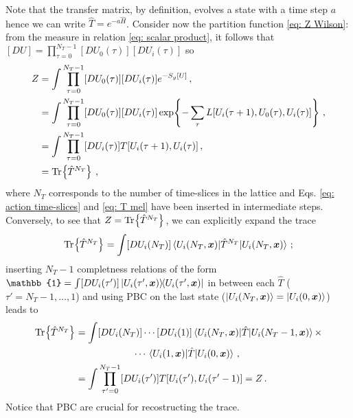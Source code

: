 \documentclass{article}
\begin{document}
Note that the transfer matrix, by definition, evolves a state with a time step $a$ hence we can write $\hat{T} = e^{-a \hat{H}}$. Consider now the partition function \eqref{eq: Z Wilson}: from the measure in relation \eqref{eq: scalar product}, it follows that $[D U] = \prod_{\tau=0}^{N_T-1} [D U_0(\tau)] [D U_i(\tau)]$ so
\begin{align}
    Z &= \int \prod_{\tau=0}^{N_T-1} [D U_0(\tau)] [D U_i(\tau)] e^{-S_g[U]} \, , \\
    &= \int \prod_{\tau=0}^{N_T-1} [D U_0(\tau)] [D U_i(\tau)] \exp \! \left\{ - \sum_\tau L[U_i(\tau+1), U_0(\tau), U_i(\tau)] \right\} \, , \\
    &= \int \prod_{\tau=0}^{N_T-1} [D U_i(\tau)] T[U_i(\tau+1), U_i(\tau)] \, , \\
    &= \Tr \! \left\{ \hat{T}^{N_T} \right\} \, ,
\end{align}
where $N_T$ corresponds to the number of time-slices in the lattice and Eqs. \eqref{eq: action time-slices} and \eqref{eq: T mel} have been inserted in intermediate steps. Conversely, to see that $Z = \Tr \! \left\{ \hat{T}^{N_T} \right\}$, we can explicitly expand the trace 
\begin{equation}
    \Tr \! \left\{ \hat{T}^{N_T} \right\} = \int [DU_i(N_T)] \mel{U_i(N_T, \vb*{x})}{\hat{T}^{N_T}}{U_i(N_T, \vb*{x})} \, ;
\end{equation}
inserting $N_T-1$ completness relations of the form $\mathbb{1} = \int [DU_i(\tau')] \ketbra{U_i(\tau', \vb*{x})}{U_i(\tau', \vb*{x})}$ in between each $\hat{T}$ ($\tau' = N_T-1, \ldots, 1$) and using PBC on the last state ($\ket{U_i(N_T, \vb*{x})} = \ket{U_i(0, \vb*{x})}$) leads to 
\begin{align}
    \Tr \! \left\{ \hat{T}^{N_T} \right\} &= \int [DU_i(N_T)] \cdots [DU_i(1)] \mel{U_i(N_T, \vb*{x})}{\hat{T}}{U_i(N_T-1, \vb*{x})} \times \\
    &\qquad \qquad \qquad \cdots \mel{U_i(1, \vb*{x})}{\hat{T}}{U_i(0, \vb*{x})} \, , \\
    &=  \int \prod_{\tau'=0}^{N_T-1} [D U_i(\tau')] T[U_i(\tau'), U_i(\tau'-1)] = Z \, .
\end{align}
Notice that PBC are crucial for recostructing the trace. 
\end{document}
